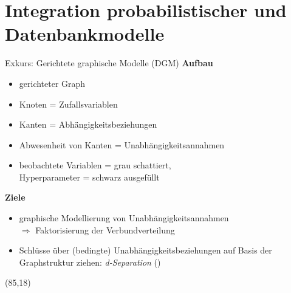 \documentclass{beamer}
\newcommand{\adjustTikzSize}[0]{\Large}
\newcommand{\tikzScale}[0]{0.55}
\newcommand{\scite}[1]{ {\scriptsize \textcolor{cgray}{(\cite{#1})}} }
\begin{document}
\section{Integration probabilistischer und Datenbankmodelle}
\begin{frame}{Exkurs: Gerichtete graphische Modelle (DGM)}
\textbf{Aufbau}
\begin{itemize}
\item gerichteter Graph
\item Knoten = Zufallsvariablen
\item Kanten = Abhängigkeitsbeziehungen
\item Abwesenheit von Kanten = Unabhängigkeitsannahmen
\item beobachtete Variablen = grau schattiert,\\Hyperparameter = schwarz ausgefüllt
\end{itemize}\pause

\textbf{Ziele}
\begin{itemize}
\item graphische Modellierung von Unabhängigkeitsannahmen\\$\Rightarrow$ Faktorisierung der Verbundverteilung
\item Schlüsse über (bedingte) Unabhängigkeitsbeziehungen auf Basis der Graphstruktur ziehen: \emph{d-Separation}\scite{pearl1988probabilistic}
\end{itemize}

\begin{textblock}{10}(85,18)
	\scalebox{\tikzScale}{\adjustTikzSize }
\end{textblock}
\end{frame}
\end{document}

